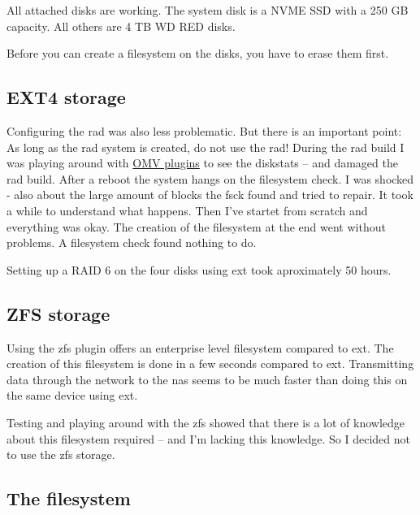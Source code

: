 All attached disks are working. The system disk is a NVME SSD with a 250 GB
capacity. All others are 4 TB WD RED disks.


Before you can create a filesystem on the disks, you have to erase them first.

\subsection{EXT4 storage}

Configuring the \gls{rad} was also less problematic. But there is an important
point: As long as the \gls{rad} system is created, do not use the \gls{rad}!
During the \gls{rad} build I was playing around with
\href{https://www.openmediavault.org/?page_id=2014}{OMV plugins} to see the
diskstats -- and damaged the \gls{rad} build. After a reboot the system hangs
on the filesystem check. I was shocked - also about the large amount of blocks
the fsck found and tried to repair. It took a while to understand what happens.
Then I've startet from scratch and everything was okay. The creation of the
filesystem at the end went without problems. A filesystem check found nothing
to do.


Setting up a RAID 6 on the four disks using \gls{ext} took aproximately 50 hours.

\subsection{ZFS storage}

Using the \gls{zfs} plugin offers an enterprise level filesystem compared to
\gls{ext}. The creation of this filesystem is done in a few seconds compared
to \gls{ext}. Transmitting data through the network to the \gls{nas} seems
to be much faster than doing this on the same device using \gls{ext}.


Testing and playing around with the \gls{zfs} showed that there is a lot of
knowledge about this filesystem required -- and I'm lacking this knowledge.
So I decided not to use the \gls{zfs} storage.

\subsection{The filesystem}

